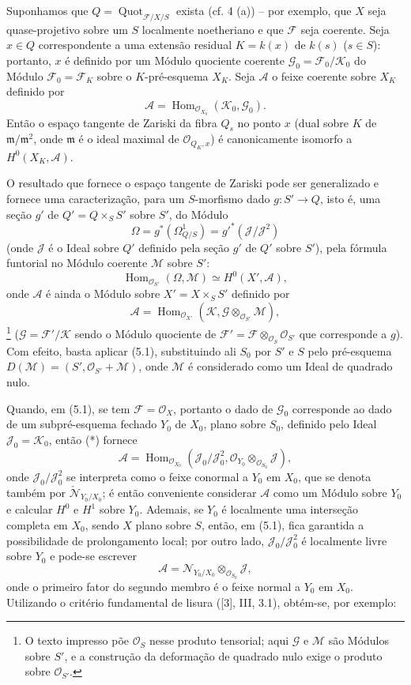  Suponhamos que
$Q=\operatorname{Quot}_{\mathcal F/X/S}$ exista (cf. 4 (a)) -- por exemplo,
que $X$ seja quase-projetivo sobre um $S$ localmente noetheriano e que
$\mathcal F$ seja coerente. Seja $x\in Q$ correspondente a uma extensão
residual $K=k(x)$ de $k(s)$ ($s\in S$):
portanto, $x$ é definido por um Módulo quociente coerente
$\mathcal G_0=\mathcal F_0/\mathcal K_0$ do Módulo
$\mathcal F_0=\mathcal F_K$ sobre o $K$-pré-esquema $X_K$. Seja $\mathcal A$
o feixe coerente sobre $X_K$ definido por
\[
\mathcal A=\operatorname{Hom}_{\mathcal O_{X_0}}(\mathcal K_0,\mathcal G_0).
\]
Então o espaço tangente de Zariski da fibra $Q_s$ no ponto $x$ (dual sobre
$K$ de $\mathfrak m/\mathfrak m^2$, onde $\mathfrak m$ é o ideal maximal de
$\mathcal O_{Q_K,x}$) é canonicamente isomorfo a $H^0(X_K,\mathcal A)$.

O resultado que fornece o espaço tangente de Zariski pode ser generalizado e
fornece uma caracterização, para um $S$-morfismo dado
$g:S'\longrightarrow Q$, isto é, uma seção $g'$ de $Q'=Q\times_SS'$ sobre
$S'$, do Módulo
\[
\Omega=g^*(\Omega^1_{Q/S})=g'^*(\mathcal J/\mathcal J^2)
\]
(onde $\mathcal J$ é o Ideal sobre $Q'$ definido pela seção $g'$ de $Q'$ sobre
$S'$), pela fórmula funtorial no Módulo coerente $\mathcal M$ sobre $S'$:
\[
\operatorname{Hom}_{\mathcal O_{S'}}(\Omega,\mathcal M)
\simeq H^0(X',\mathcal A),
\]
onde $\mathcal A$ é ainda o Módulo sobre $X'=X\times_SS'$ definido por
\[
\mathcal A=\operatorname{Hom}_{\mathcal O_{X'}}
(\mathcal K,\mathcal G\otimes_{\mathcal O_{S'}}\mathcal M),
\]
\footnote{O texto impresso põe $\mathcal O_S$ nesse produto tensorial; aqui
$\mathcal G$ e $\mathcal M$ são Módulos sobre $S'$, e a construção da
deformação de quadrado nulo exige o produto sobre $\mathcal O_{S'}$.}
($\mathcal G=\mathcal F'/\mathcal K$ sendo o Módulo quociente de
$\mathcal F'=\mathcal F\otimes_{\mathcal O_S}\mathcal O_{S'}$ que corresponde
a $g$). Com efeito, basta aplicar (5.1), substituindo ali $S_0$ por $S'$ e $S$
pelo pré-esquema $D(\mathcal M)=(S',\mathcal O_{S'}+\mathcal M)$, onde
$\mathcal M$ é considerado como um Ideal de quadrado nulo.

Quando, em (5.1), se tem $\mathcal F=\mathcal O_X$, portanto o dado de
$\mathcal G_0$ corresponde ao dado de um subpré-esquema fechado $Y_0$ de
$X_0$, plano sobre $S_0$, definido pelo Ideal
$\mathcal J_0=\mathcal K_0$, então (*) fornece
\[
\mathcal A=\operatorname{Hom}_{\mathcal O_{X_0}}
(\mathcal J_0/\mathcal J_0^2,
\mathcal O_{Y_0}\otimes_{\mathcal O_{S_0}}\mathcal J),
\]
onde $\mathcal J_0/\mathcal J_0^2$ se interpreta como o feixe conormal a $Y_0$ em
$X_0$, que se denota também por
$\check{\mathcal N}_{Y_0/X_0}$; é então conveniente considerar $\mathcal A$
como um Módulo sobre $Y_0$ e calcular $H^0$ e $H^1$ sobre $Y_0$. Ademais, se
$Y_0$ é localmente uma interseção completa em $X_0$, sendo $X$ plano sobre
$S$, então, em (5.1), fica garantida a possibilidade de prolongamento local;
por outro lado, $\mathcal J_0/\mathcal J_0^2$ é localmente livre sobre $Y_0$ e
pode-se escrever
\[
\mathcal A=\mathcal N_{Y_0/X_0}\otimes_{\mathcal O_{S_0}}\mathcal J,
\]
onde o primeiro fator do segundo membro é o feixe normal a $Y_0$ em $X_0$.
Utilizando o critério fundamental de lisura ([3], III, 3.1), obtém-se, por
exemplo:


